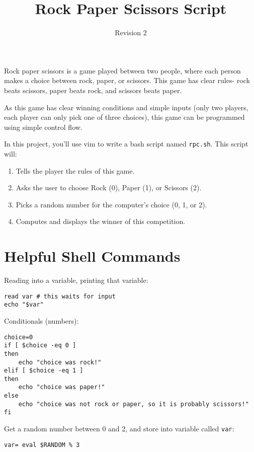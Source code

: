 \documentclass{article}
\title{Rock Paper Scissors Script}
\author{}
\date{Revision 2}
\begin{document}
\maketitle
\thispagestyle{empty}

Rock paper scissors is a game played between two people, where each person
makes a choice between rock, paper, or scissors. This game has clear rules-
rock beats scissors, paper beats rock, and scissors beats paper.

As this game has clear winning conditions and simple inputs (only two players,
each player can only pick one of three choices), this game can be programmed
using simple control flow.

In this project, you'll use vim to write a bash script named \texttt{rpc.sh}. This script will:
\begin{enumerate}
    \item Tells the player the rules of this game.
    \item Asks the user to choose Rock (0), Paper (1), or Scissors (2).
    \item Picks a random number for the computer's choice (0, 1, or 2).
    \item Computes and displays the winner of this competition.
\end{enumerate}

\section*{Helpful Shell Commands}
Reading into a variable, printing that variable:
\begin{lstlisting}
read var # this waits for input
echo "$var"
\end{lstlisting}
Conditionals (numbers):
\begin{lstlisting}
choice=0
if [ $choice -eq 0 ]
then
    echo "choice was rock!"
elif [ $choice -eq 1 ]
then
    echo "choice was paper!"
else
    echo "choice was not rock or paper, so it is probably scissors!"
fi
\end{lstlisting}
Get a random number between 0 and 2, and store into variable called \texttt{var}:
\begin{lstlisting}
var= eval $RANDOM % 3
\end{lstlisting}
\end{document}

